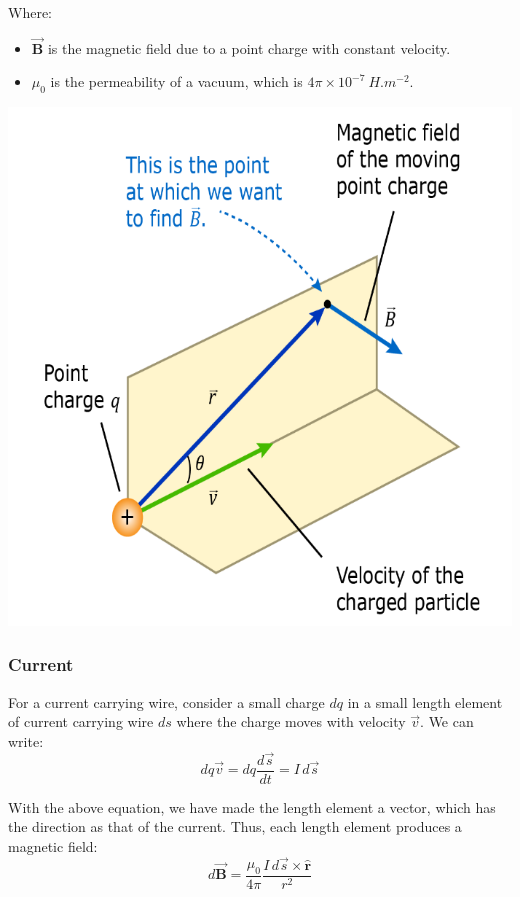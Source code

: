 \documentclass[11pt]{article}
\begin{document}
Where:
\begin{itemize}
\item \(\vec{\boldsymbol{B}}\) is the magnetic field due to a point charge with constant velocity.
\item \(\mu_0\) is the permeability of a vacuum, which is \(4 \pi \times 10^{-7} \ \unit{H.m^{-2}}\).
\end{itemize}

\begin{center}
\includegraphics[scale=0.55]{./images/biot-savart-law-moving-charge.png}
\end{center}
\subsubsection{Current}
\label{sec:org3997da7}
For a current carrying wire, consider a small charge \(dq\) in a small length element of current carrying wire \(ds\) where the charge moves with velocity \(\vec{v}\). We can write:
\[dq \vec{v} = dq \frac{d \vec{s}}{dt} = I \, d \vec{s}\]

With the above equation, we have made the length element a vector, which has the direction as that of the current. Thus, each length element produces a magnetic field:
\[d \vec{\boldsymbol{B}} = \frac{\mu_0}{4\pi} \frac{I \, d \vec{s} \times \hat{\boldsymbol{r}}}{r^2}\]
\end{document}
